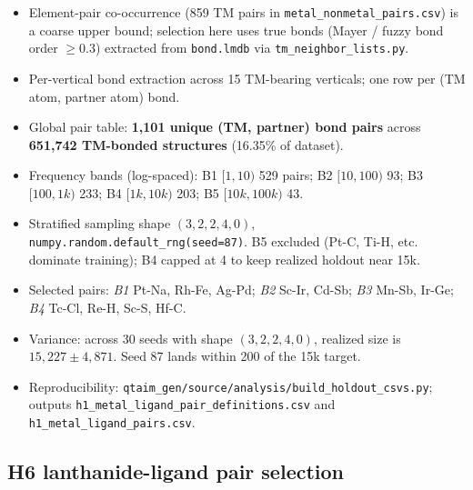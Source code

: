 \begin{itemize}
  \item Element-pair co-occurrence (859 TM pairs in
    \texttt{metal\_nonmetal\_pairs.csv}) is a coarse upper bound;
    selection here uses true bonds (Mayer / fuzzy bond order $\geq 0.3$)
    extracted from \texttt{bond.lmdb} via \texttt{tm\_neighbor\_lists.py}.
  \item Per-vertical bond extraction across 15 TM-bearing verticals;
    one row per (TM atom, partner atom) bond.
  \item Global pair table: \textbf{1{,}101 unique (TM, partner) bond
    pairs} across \textbf{651{,}742 TM-bonded structures} (16.35\% of
    dataset).
  \item Frequency bands (log-spaced): B1 $[1,10)$ 529 pairs;
    B2 $[10,100)$ 93; B3 $[100,1k)$ 233; B4 $[1k,10k)$ 203;
    B5 $[10k,100k)$ 43.
  \item Stratified sampling shape $(3, 2, 2, 4, 0)$,
    \texttt{numpy.random.default\_rng(seed=87)}. B5 excluded (Pt-C,
    Ti-H, etc. dominate training); B4 capped at 4 to keep realized
    holdout near 15k.
  \item Selected pairs: \emph{B1} Pt-Na, Rh-Fe, Ag-Pd; \emph{B2} Sc-Ir,
    Cd-Sb; \emph{B3} Mn-Sb, Ir-Ge; \emph{B4} Tc-Cl, Re-H, Sc-S, Hf-C.
  \item Variance: across 30 seeds with shape $(3,2,2,4,0)$, realized
    size is $15{,}227 \pm 4{,}871$. Seed 87 lands within 200 of the 15k
    target.
  \item Reproducibility:
    \texttt{qtaim\_gen/source/analysis/build\_holdout\_csvs.py}; outputs
    \texttt{h1\_metal\_ligand\_pair\_definitions.csv} and
    \texttt{h1\_metal\_ligand\_pairs.csv}.
\end{itemize}

\subsection{H6 lanthanide-ligand pair selection}
\label{app:heldout-h6}

